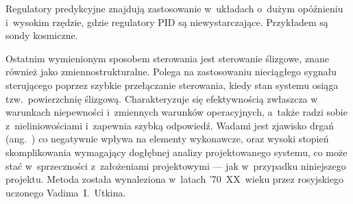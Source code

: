 Regulatory predykcyjne znajdują zastosowanie w~układach o~dużym opóźnieniu i~wysokim rzędzie, gdzie regulatory PID są niewystarczające. Przykładem są sondy kosmiczne.

Ostatnim wymienionym sposobem sterowania jest sterowanie ślizgowe, znane również jako zmiennostrukturalne. Polega na zastosowaniu nieciągłego sygnału sterującego poprzez szybkie przełączanie sterowania, kiedy stan systemu osiąga tzw.~powierzchnię ślizgową. Charakteryzuje się efektywnością zwłaszcza w warunkach niepewności i~zmiennych warunków operacyjnych, a~także radzi sobie z~nieliniowościami i~zapewnia szybką odpowiedź\cite{bib:slideuncertanity}. Wadami jest zjawisko drgań (ang.~) co negatywnie wpływa na elementy wykonawcze, oraz wysoki stopień skomplikowania wymagający dogłębnej analizy projektowanego systemu, co może stać w~sprzeczności z~założeniami projektowymi --- jak w~przypadku niniejszego projektu. Metoda została wynaleziona w~latach '70~XX~wieku przez rosyjskiego uczonego Vadima~I.~Utkina\cite{bib:slideinvention}.